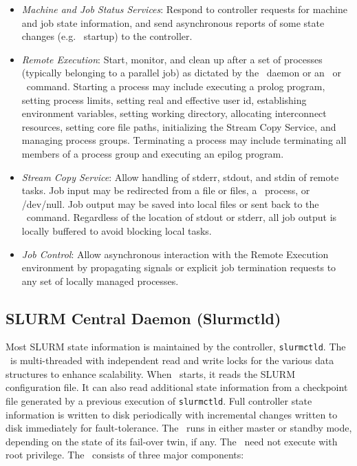 \begin{itemize}
\item {\em Machine and Job Status Services}:  Respond to controller
requests for machine and job state information, and send asynchronous
reports of some state changes (e.g. \slurmd\ startup) to the controller.

\item {\em Remote Execution}: Start, monitor, and clean up after a set
of processes (typically belonging to a parallel job) as dictated by the
\slurmctld\ daemon or an \srun\ or \scancel\ command. Starting a process may
include executing a prolog program, setting process limits, setting real
and effective user id, establishing environment variables, setting working
directory, allocating interconnect resources, setting core file paths,
initializing the Stream Copy Service, and managing
process groups. Terminating a process may include terminating all members
of a process group and executing an epilog program.

\item {\em Stream Copy Service}: Allow handling of stderr, stdout, and
stdin of remote tasks. Job input may be redirected from a file or files, a
\srun\ process, or /dev/null.  Job output may be saved into local files or
sent back to the \srun\ command. Regardless of the location of stdout or stderr,
all job output is locally buffered to avoid blocking local tasks.

\item {\em Job Control}: Allow asynchronous interaction with the
Remote Execution environment by propagating signals or explicit job
termination requests to any set of locally managed processes.

\end{itemize}

\subsection{SLURM Central Daemon (Slurmctld)}

Most SLURM state information is maintained by the controller, {\tt slurmctld}.
The \slurmctld\ is multi-threaded with independent read and write locks
for the various data structures to enhance scalability.
When \slurmctld\ starts, it reads the SLURM configuration file.
It can also read additional state information
from a checkpoint file generated by a previous execution of {\tt slurmctld}.
Full controller state information is written to
disk periodically with incremental changes written to disk immediately
for fault-tolerance.
The \slurmctld\ runs in either master or standby mode, depending on the
state of its fail-over twin, if any.
The \slurmctld\ need not execute with root privilege.
The \slurmctld\ consists of three major components:

